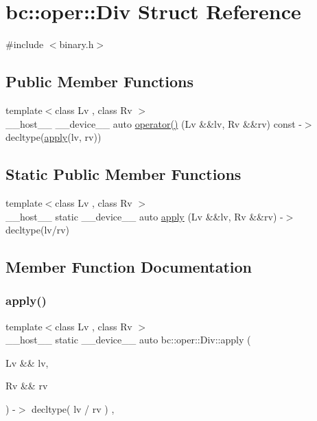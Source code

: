 \hypertarget{structbc_1_1oper_1_1Div}{}\section{bc\+:\+:oper\+:\+:Div Struct Reference}
\label{structbc_1_1oper_1_1Div}


{\ttfamily \#include $<$binary.\+h$>$}

\subsection*{Public Member Functions}
\begin{DoxyCompactItemize}
\item 
{\footnotesize template$<$class Lv , class Rv $>$ }\\\+\_\+\+\_\+host\+\_\+\+\_\+ \+\_\+\+\_\+device\+\_\+\+\_\+ auto \hyperlink{structbc_1_1oper_1_1Div_ad2f58ef903e222b4046352e9c948efab}{operator()} (Lv \&\&lv, Rv \&\&rv) const -\/$>$ decltype(\hyperlink{structbc_1_1oper_1_1Div_a1a74024477b64871a072d6861a3a0c44}{apply}(lv, rv))
\end{DoxyCompactItemize}
\subsection*{Static Public Member Functions}
\begin{DoxyCompactItemize}
\item 
{\footnotesize template$<$class Lv , class Rv $>$ }\\\+\_\+\+\_\+host\+\_\+\+\_\+ static \+\_\+\+\_\+device\+\_\+\+\_\+ auto \hyperlink{structbc_1_1oper_1_1Div_a1a74024477b64871a072d6861a3a0c44}{apply} (Lv \&\&lv, Rv \&\&rv) -\/$>$ decltype(lv/rv)
\end{DoxyCompactItemize}


\subsection{Member Function Documentation}
\mbox{\label{structbc_1_1oper_1_1Div_a1a74024477b64871a072d6861a3a0c44}} 
\subsubsection{\texorpdfstring{apply()}{apply()}}
{\footnotesize\ttfamily template$<$class Lv , class Rv $>$ \\
\+\_\+\+\_\+host\+\_\+\+\_\+ static \+\_\+\+\_\+device\+\_\+\+\_\+ auto bc\+::oper\+::\+Div\+::apply (\begin{DoxyParamCaption}\item[{Lv \&\&}]{lv,  }\item[{Rv \&\&}]{rv }\end{DoxyParamCaption}) -\/$>$ decltype( lv / rv ) \hspace{0.3cm}{\ttfamily [inline]}, {\ttfamily [static]}}

